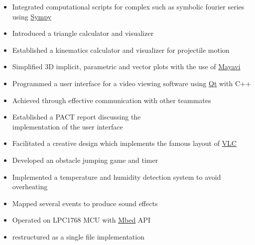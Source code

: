 \documentclass[11pt,a4paper,ragged2e]{altacv}
\begin{document}
\begin{paracol}{2}
\begin{itemize}
\item Integrated computational scripts for complex such as symbolic fourier series using \href{https://www.sympy.org/en/index.html}{Sympy}
\item Introduced a triangle calculator and visualizer
\item Established a kinematics calculator and visualizer for projectile motion
\item Simplified 3D implicit, parametric and vector plots with the use of \href{https://docs.enthought.com/mayavi/mayavi/}{Mayavi}
\end{itemize}
\divider

\begin{itemize}
\item Programmed a user interface for a video viewing software using \href{https://www.qt.io/}{Qt} with C++
\item Achieved through effective communication with other teammates
\item Established a PACT report discussing the \\ implementation of the user interface
\item Facilitated a creative design which implements the famous layout of \href{https://www.videolan.org/vlc/index.en_GB.html}{VLC}
\end{itemize}
\divider

\begin{itemize}
\item Developed an obstacle jumping game and timer
\item Implemented a temperature and humidity detection system to avoid overheating
\item Mapped several events to produce sound effects
\item Operated on LPC1768 MCU with \href{https://os.mbed.com/}{Mbed} API
\item restructured as a single file implementation
\end{itemize}


\end{paracol}
\end{document}

